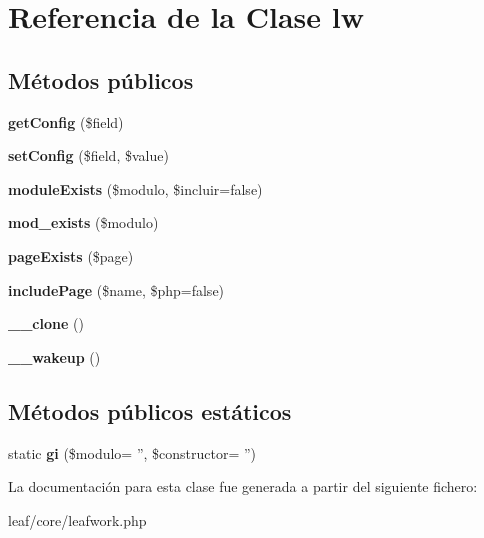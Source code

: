 \hypertarget{classlw}{\section{Referencia de la Clase lw}
\label{classlw}
}
\subsection*{Métodos públicos}
\begin{DoxyCompactItemize}
\item 
\hypertarget{classlw_af394a71fca91e024e566871383d33e2c}{{\bfseries get\-Config} (\$field)}\label{classlw_af394a71fca91e024e566871383d33e2c}

\item 
\hypertarget{classlw_a7351419af27f87d315f7e3f2d8174c5d}{{\bfseries set\-Config} (\$field, \$value)}\label{classlw_a7351419af27f87d315f7e3f2d8174c5d}

\item 
\hypertarget{classlw_abcf9b188696b4d63cb90218064e076c3}{{\bfseries module\-Exists} (\$modulo, \$incluir=false)}\label{classlw_abcf9b188696b4d63cb90218064e076c3}

\item 
\hypertarget{classlw_aba61508ddf1137390531f5df811276a4}{{\bfseries mod\-\_\-exists} (\$modulo)}\label{classlw_aba61508ddf1137390531f5df811276a4}

\item 
\hypertarget{classlw_a373d0d56d75bed4f27708430d94c1895}{{\bfseries page\-Exists} (\$page)}\label{classlw_a373d0d56d75bed4f27708430d94c1895}

\item 
\hypertarget{classlw_a09a4cc34f2223b9f0c58d7b0e9362a3e}{{\bfseries include\-Page} (\$name, \$php=false)}\label{classlw_a09a4cc34f2223b9f0c58d7b0e9362a3e}

\item 
\hypertarget{classlw_ad0cb87b388bc74d63dc884accdca8713}{{\bfseries \-\_\-\-\_\-clone} ()}\label{classlw_ad0cb87b388bc74d63dc884accdca8713}

\item 
\hypertarget{classlw_a19dd44fe063cfd1cbafe97452e57666c}{{\bfseries \-\_\-\-\_\-wakeup} ()}\label{classlw_a19dd44fe063cfd1cbafe97452e57666c}

\end{DoxyCompactItemize}
\subsection*{Métodos públicos estáticos}
\begin{DoxyCompactItemize}
\item 
\hypertarget{classlw_a2a82141a13e0594d6ebd540801a927b7}{static {\bfseries gi} (\$modulo= '', \$constructor= '')}\label{classlw_a2a82141a13e0594d6ebd540801a927b7}

\end{DoxyCompactItemize}


La documentación para esta clase fue generada a partir del siguiente fichero\-:\begin{DoxyCompactItemize}
\item 
leaf/core/leafwork.\-php\end{DoxyCompactItemize}

